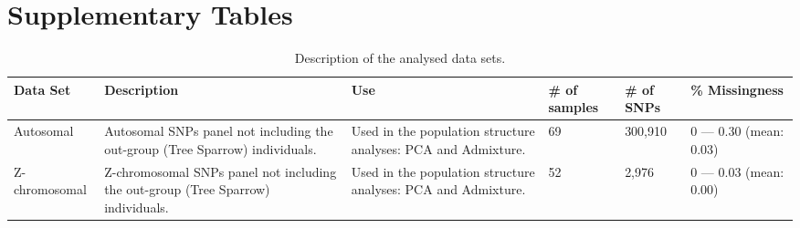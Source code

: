 \chapter{Supplementary Tables}
\label{cp:01-Tables-SI}

\begin{table}[!htpb]
    \caption{Description of the analysed data sets.}
    \label{tab:table-01}
    \begin{tabularx}{\textwidth}{l X X l l l}
        \toprule
        \textbf{Data Set} & \textbf{Description} & \textbf{Use} & \textbf{\# of samples} & \textbf{\# of SNPs} & \textbf{\% Missingness} \\ 
        \midrule
        Autosomal & Autosomal SNPs panel not including the out-group (Tree Sparrow) individuals. & Used in the population structure analyses: PCA and Admixture. & 69 & 300,910 & 0 --- 0.30 (mean: 0.03) \\ 
        Z-chromosomal & Z-chromosomal SNPs panel not including the out-group (Tree Sparrow) individuals. & Used in the population structure analyses: PCA and Admixture. & 52 & 2,976 & 0 --- 0.03 (mean: 0.00) \\
        \bottomrule
    \end{tabularx}
\end{table}